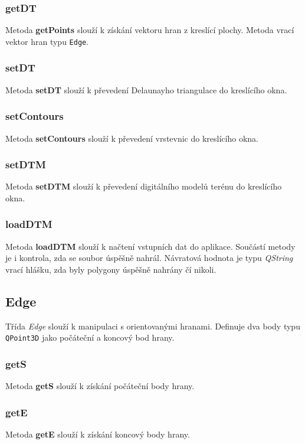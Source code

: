 \documentclass[a4paper, 12pt]{article}
\begin{document}
\subsubsection*{getDT}
Metoda \textbf{getPoints} slouží k získání vektoru hran z kreslící plochy. Metoda vrací vektor hran typu \texttt{Edge}.

\subsubsection*{setDT}
Metoda \textbf{setDT} slouží k převedení Delaunayho triangulace do kreslícího okna.

\subsubsection*{setContours}
Metoda \textbf{setContours} slouží k převedení vrstevnic do kreslícího okna.

\subsubsection*{setDTM}
Metoda \textbf{setDTM} slouží k převedení digitálního modelů terénu do kreslícího okna.

\subsubsection*{loadDTM}
Metoda \textbf{loadDTM} slouží k načtení vstupních dat do aplikace. Součástí metody je i kontrola, zda se soubor úspěšně nahrál. Návratová hodnota je typu \textsl{QString} vrací hlášku, zda byly polygony úspěšně nahrány čí nikoli.


\subsection{Edge}
Třída \textit{Edge} slouží k manipulaci s orientovanými hranami. Definuje dva body typu \texttt{QPoint3D} jako počáteční a koncový bod hrany.

\subsubsection*{getS}
Metoda \textbf{getS} slouží k získání počáteční body hrany. 

\subsubsection*{getE}
Metoda \textbf{getE} slouží k získání koncový body hrany. 
\end{document}
